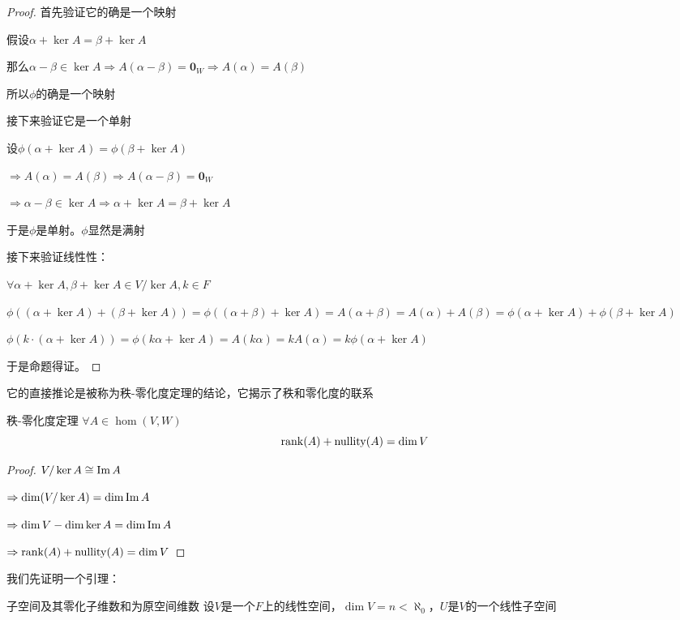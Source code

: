 \documentclass[12pt, a4paper, oneside, UTF8]{ctexbook}
\begin{document}
\begin{para}{0}
\begin{proof}
							首先验证它的确是一个映射

							假设$\alpha +\ker A=\beta +\ker A$

							那么$\alpha -\beta \in \ker A \Rightarrow A(\alpha -\beta )=\mathbf{0}_W \Rightarrow A(\alpha )=A(\beta )$

							所以$\phi $的确是一个映射

							接下来验证它是一个单射

							设$\phi (\alpha + \ker A)=\phi (\beta +\ker A)$
							
							$\Rightarrow A(\alpha )=A(\beta ) \Rightarrow A(\alpha -\beta )=\mathbf{0}_W$

							$\Rightarrow \alpha - \beta  \in \ker A \Rightarrow \alpha +\ker A=\beta +\ker A$

							于是$\phi $是单射。$\phi $显然是满射

							接下来验证线性性：

							$\forall \alpha +\ker A,\beta +\ker A \in V/\ker A,k \in F$
							
							$\phi \left((\alpha +\ker A)+(\beta +\ker A)\right)=\phi \left((\alpha +\beta )+\ker A\right)=A(\alpha +\beta )=A(\alpha )+A(\beta )=\phi (\alpha +\ker A)+\phi (\beta +\ker A)$
						
							$\phi \left(k\cdot (\alpha +\ker A)\right)=\phi (k\alpha +\ker A)=A(k\alpha )=kA(\alpha )=k\phi (\alpha +\ker A)$
						
							于是命题得证。
						\end{proof}

						它的直接推论是被称为秩-零化度定理的结论，它揭示了秩和零化度的联系
						\begin{them}{秩-零化度定理}{}
							$\forall A \in \hom(V,W)$
							\begin{equation}
								\operatorname{rank}(A)+\operatorname{nullity}(A) = \dim V
							\end{equation}
						\end{them}
						\begin{proof}
							$V/\ker A \cong \operatorname{Im} A$

							$\Rightarrow \dim(V/\ker A)=\dim \operatorname{Im} A$

							$\Rightarrow \dim V - \dim \ker A = \dim \operatorname{Im} A$

							$\Rightarrow \operatorname{rank}(A)+\operatorname{nullity}(A)= \dim V$
						\end{proof}
						我们先证明一个引理：
						\begin{lemma}{子空间及其零化子维数和为原空间维数}{}
							设$V$是一个$F$上的线性空间，$\dim V = n < \aleph_0$，$U$是$V$的一个线性子空间


\end{lemma}
\end{para}
\end{document}
